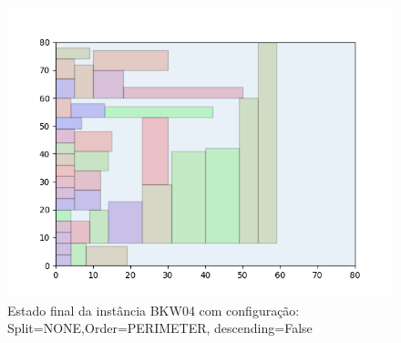 \begin{figure}[H]
    \centering
    \caption[]{Estado final da instância BKW04 com configuração: Split=NONE,Order=PERIMETER, descending=False}
    \label{fig:bkw04-none-perimeter-false}
    \includegraphics[scale=0.5]{output/figures/bkw/bkw04/none/perimeter/false/00}
\end{figure}
